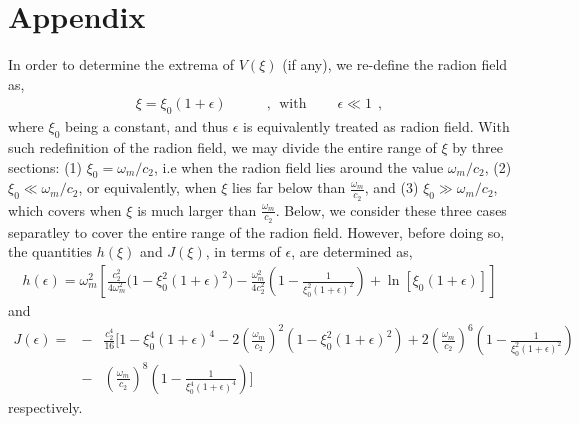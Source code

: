 \documentclass{article}
\begin{document}
\section*{Appendix}
In order to determine the extrema of $V(\xi)$ (if any), we re-define 
the radion field as,
\begin{eqnarray}
 \xi = \xi_\mathrm{0}\left(1 + \epsilon\right)~~~~~~~~~~~~~,~~\mathrm{with}~~~~~~~~~~\epsilon \ll 1~~,
 \label{extremum 1}
\end{eqnarray}
where $\xi_\mathrm{0}$ being a constant, and thus $\epsilon$ is equivalently treated as radion field. With such redefinition of the radion field, 
we may divide the entire range of $\xi$ by three sections: (1) $\xi_\mathrm{0} = \omega_m/c_2$, i.e when the radion field lies around the value 
$\omega_m/c_2$, (2) $\xi_\mathrm{0} \ll \omega_m/c_2$, or equivalently, when $\xi$ lies far below than $\frac{\omega_m}{c_2}$, and (3) 
$\xi_\mathrm{0} \gg \omega_m/c_2$, which covers when $\xi$ is much larger than $\frac{\omega_m}{c_2}$. Below, we 
consider these three cases separatley to cover the entire range of the radion field. However, before doing so, the quantities $h(\xi)$ and 
$J(\xi)$, in terms of $\epsilon$, are determined as,
\begin{eqnarray}
 h(\epsilon) = \omega_m^2\left[\frac{c_2^2}{4\omega_m^2}\big(1 - \xi_\mathrm{0}^2\left(1 + \epsilon\right)^2\big) 
 - \frac{\omega_m^2}{4c_2^2}\left(1 - \frac{1}{\xi_\mathrm{0}^2\left(1 + \epsilon\right)^2}\right) 
 + \ln{\left[\xi_\mathrm{0}\left(1 + \epsilon\right)\right]}\right]
 \label{extremum 2}
\end{eqnarray}
and
\begin{eqnarray}
 J(\epsilon) = &-&\frac{c_2^4}{16}\bigg[1-\xi_\mathrm{0}^4\left(1 + \epsilon\right)^4 - 2\left(\frac{\omega_m}{c_2}\right)^2
 \left(1-\xi_\mathrm{0}^2\left(1 + \epsilon\right)^2\right) + 2\left(\frac{\omega_m}{c_2}\right)^6\left(1 - 
 \frac{1}{\xi_\mathrm{0}^2\left(1 + \epsilon\right)^2}\right)\nonumber\\ 
 &-&\left(\frac{\omega_m}{c_2}\right)^8\left(1 - 
 \frac{1}{\xi_\mathrm{0}^4\left(1 + \epsilon\right)^4}\right)\bigg]
 \label{extremum 3}
\end{eqnarray}
respectively.
\end{document}
